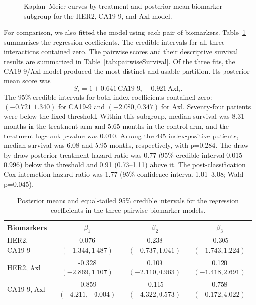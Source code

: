 \begin{figure}[!htbp]
\centering
{}
\caption[Kaplan--Meier curves for the three-biomarker model]{Kaplan--Meier
curves by treatment and posterior-mean biomarker subgroup for the HER2,
CA19-9, and Axl model.}
\label{fig:threeBiomarkerKM}
\end{figure}

For comparison, we also fitted the model using each pair of biomarkers.
Table~\ref{tab:pairwiseAnalysis} summarizes the regression coefficients. The
credible intervals for all three interactions contained zero. The pairwise
scores and their descriptive survival results are summarized in
Table~\ref{tab:pairwiseSurvival}. Of the three fits, the CA19-9/Axl model
produced the most distinct and usable partition. Its posterior-mean score was
\begin{equation}
\label{eq:caAxlScore}
    S_i=1+0.641\,\mathrm{CA19\mbox{-}9}_i-0.921\,\mathrm{Axl}_i.
\end{equation}
The 95\% credible intervals for both index coefficients contained zero:
$(-0.721,1.340)$ for CA19-9 and $(-2.080,0.347)$ for Axl. Seventy-four
patients were below the fixed threshold. Within this subgroup,
median survival was 8.31 months in the treatment arm and 5.65 months in the
control arm, and the treatment log-rank p-value was 0.010. Among the 495
index-positive patients, median survival was 6.08 and 5.95 months,
respectively, with p=0.284. The draw-by-draw posterior treatment hazard ratio
was 0.77 (95\% credible interval 0.015--0.996) below the threshold and 0.91
(0.73--1.11) above it. The post-classification Cox interaction hazard ratio
was 1.77 (95\% confidence interval 1.01--3.08; Wald p=0.045).

\begin{table}[!htbp]
\caption[Posterior regression estimates for the pairwise analyses]{Posterior
means and equal-tailed 95\% credible intervals for the regression coefficients
in the three pairwise biomarker models.}
\label{tab:pairwiseAnalysis}
\centering
\scriptsize
\begin{tabular}{lccc}
\toprule
Biomarkers & $\beta_1$ & $\beta_2$ & $\beta_3$ \\
\midrule
HER2, CA19-9
& 0.076 $(-1.344,1.487)$
& 0.238 $(-0.737,1.041)$
& -0.305 $(-1.743,1.224)$ \\
HER2, Axl
& -0.328 $(-2.869,1.107)$
& 0.109 $(-2.110,0.963)$
& 0.120 $(-1.418,2.691)$ \\
CA19-9, Axl
& -0.859 $(-4.211,-0.004)$
& -0.115 $(-4.322,0.573)$
& 0.758 $(-0.172,4.022)$ \\
\bottomrule
\end{tabular}
\end{table}

